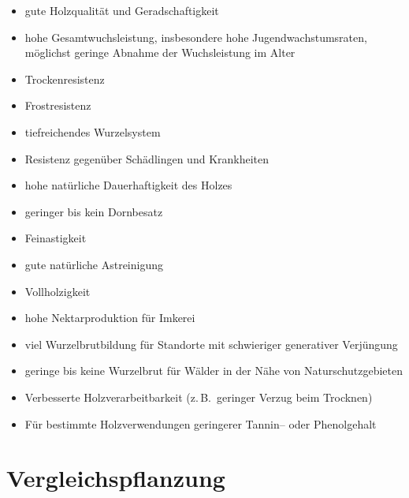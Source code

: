 \documentclass[twocolumn]{scrartcl}
\begin{document}
\begin{itemize}
  \item gute Holzqualität und Geradschaftigkeit
  \item hohe Gesamtwuchsleistung, insbesondere hohe Jugendwachstumsraten, möglichst geringe Abnahme der Wuchsleistung im Alter
  \item Trockenresistenz
  \item Frostresistenz
  \item tiefreichendes Wurzelsystem
  \item Resistenz gegenüber Schädlingen und Krankheiten
  \item hohe natürliche Dauerhaftigkeit des Holzes
  \item geringer bis kein Dornbesatz
  \item Feinastigkeit
  \item gute natürliche Astreinigung
  \item Vollholzigkeit
  \item hohe Nektarproduktion für Imkerei
  \item viel Wurzelbrutbildung für Standorte mit schwieriger generativer Verjüngung
  \item geringe bis keine Wurzelbrut für Wälder in der Nähe von Naturschutzgebieten
  \item Verbesserte Holzverarbeitbarkeit (z.\,B.\ geringer Verzug beim Trocknen)
  \item Für bestimmte Holzverwendungen geringerer Tannin-- oder Phenolgehalt 
\end{itemize}

\section{Vergleichspflanzung}
\end{document}
